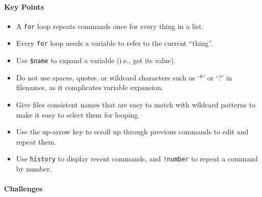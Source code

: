 \documentclass[]{book}
\begin{document}
\mbox{}\paragraph{Key Points}

\begin{itemize}
\item
  A \texttt{for} loop repeats commands once for every thing in a list.
\item
  Every \texttt{for} loop needs a variable to refer to the current
  ``thing''.
\item
  Use \texttt{\$name} to expand a variable (i.e., get its value).
\item
  Do not use spaces, quotes, or wildcard characters such as `*' or `?'
  in filenames, as it complicates variable expansion.
\item
  Give files consistent names that are easy to match with wildcard
  patterns to make it easy to select them for looping.
\item
  Use the up-arrow key to scroll up through previous commands to edit
  and repeat them.
\item
  Use \texttt{history} to display recent commands, and \texttt{!number}
  to repeat a command by number.
\end{itemize}

\mbox{}\paragraph{Challenges}
\end{document}
